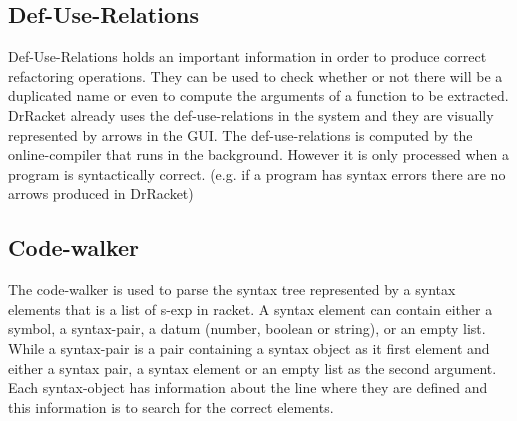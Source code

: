 \subsection{Def-Use-Relations}
Def-Use-Relations holds an important information in order to produce correct refactoring operations. %
They can be used to check whether or not there will be a duplicated name
or even to compute the arguments of a function to be extracted.
DrRacket already uses the def-use-relations in the system and they are visually  %
represented by arrows in the GUI.
The def-use-relations is computed by the online-compiler that runs in the background.
However it is only processed when a program is syntactically correct. (e.g. if
a program has syntax errors there are no arrows produced in DrRacket)

\subsection{Code-walker}
The code-walker is used to parse the syntax tree represented by a syntax elements
that is a list of s-exp in racket. %
A syntax element can contain either a symbol, a syntax-pair, a datum (number, boolean or string),
or an empty list. %
While a syntax-pair is a pair containing a syntax object as it first element and
either a syntax pair, a syntax element or an empty list as the second argument.
Each syntax-object has information about the line where they are defined and this
information is to search for the correct elements.


